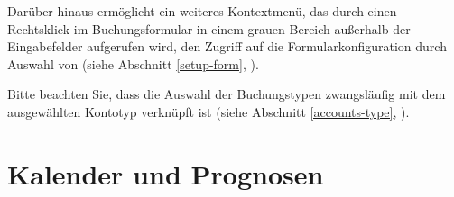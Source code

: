 	Darüber hinaus ermöglicht ein weiteres Kontextmenü, das durch einen Rechtsklick im Buchungsformular in einem grauen Bereich außerhalb der Eingabefelder aufgerufen wird, den Zugriff auf die Formularkonfiguration durch Auswahl von  (siehe Abschnitt \vref{setup-form}, ).
	
	Bitte beachten Sie, dass die Auswahl der Buchungstypen zwangsläufig mit dem ausgewählten Kontotyp verknüpft ist (siehe Abschnitt \vref{accounts-type}, ).


\section{Kalender und Prognosen\label{plannedtransactions-calendar}}

